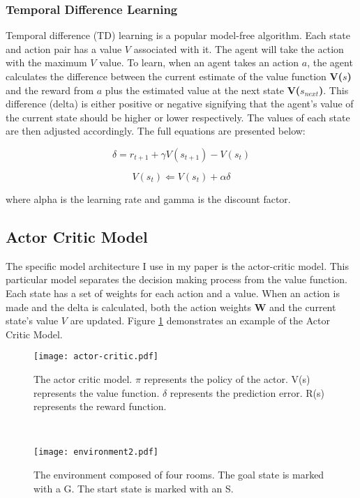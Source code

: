 \subsubsection{Temporal Difference Learning}
Temporal difference (TD) learning is a popular model-free algorithm. Each state and action pair has a value $V$ associated with it. The agent will take the action with the maximum $V$ value. To learn, when an agent takes an action $a$, the agent calculates the difference between the current estimate of the value function \textbf{V($s$)} and the reward from $a$ plus the estimated value at the next state \textbf{V($s_{next}$)}. This difference (delta) is either positive or negative signifying that the agent's value of the current state should be higher or lower respectively. The values of each state are then adjusted accordingly. The full equations are presented below: 

\begin{equation}\delta = r_{t+1} + \gamma V(s_{t+1}) - V(s_{t})\end{equation}

\begin{equation}V(s_t) \Longleftarrow V(s_t) + \alpha\delta\end{equation}

where alpha is the learning rate and gamma is the discount factor.

\subsection{Actor Critic Model}
The specific model architecture I use in my paper is the actor-critic model. This particular model separates the decision making process from the value function. Each state has a set of weights for each action and a value. When an action is made and the delta is calculated, both the action weights \textbf{W} and the current state's value $V$ are updated. Figure \ref{fig:actor-critic} demonstrates an example of the Actor Critic Model.

\begin{figure*}[h]
    \centering
    \begin{subfigure}[h]{0.49\textwidth}
        \centering
        \texttt{[image: actor-critic.pdf]}
        \caption{The actor critic model. $\pi$ represents the policy of the actor. V(s) represents the value function. $\delta$ represents the prediction error. R(s) represents the reward function.}
		\label{fig:actor-critic}
    \end{subfigure}%
    ~ 
    \begin{subfigure}[h]{0.49\textwidth}
        \centering
        \texttt{[image: environment2.pdf]}
        \caption{The environment composed of four rooms. The goal state is marked with a G. The start state is marked with an S.}
		\label{fig:environment}
    \end{subfigure}
\end{figure*}

